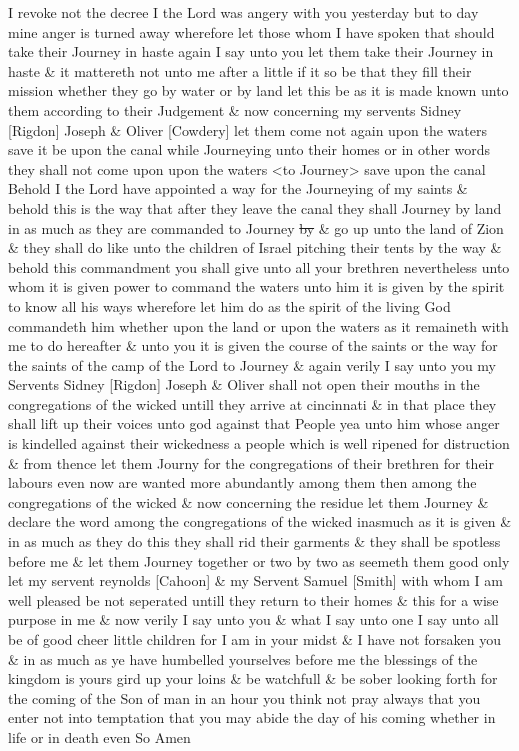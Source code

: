 {I revoke not the decree I the Lord was angery with you yesterday but to day mine anger is turned away wherefore let those whom I have spoken that should take their Journey in haste again I say unto you let them take their Journey in haste \& it mattereth not unto me after a little if it so be that they fill their mission whether they go by water or by land let this be as it is made known unto them according to their Judgement \& now concerning my servents Sidney [Rigdon] Joseph \& Oliver [Cowdery] let them come not again upon the waters save it be upon the canal while Journeying unto their homes or in other words they shall not come upon upon the waters <to Journey> save upon the canal Behold I the Lord have appointed a way for the Journeying of my saints \& behold this is the way that after they leave the canal they shall Journey by land in as much as they are commanded to Journey \sout{by} \& go up unto the land of Zion \& they shall do like unto the children of Israel pitching their tents by the way \& behold this commandment you shall give unto all your brethren nevertheless unto whom it is given power to command the waters unto him it is given by the spirit to know all his ways wherefore let him do as the spirit of the living God commandeth him whether upon the land or upon the waters as it remaineth with me to do hereafter \& unto you it is given the course of the saints or the way for the saints of the camp of the Lord to Journey \& again verily I say unto you my Servents Sidney [Rigdon] Joseph \& Oliver shall not open their mouths in the congregations of the wicked untill they arrive at cincinnati \& in that place they shall lift up their voices unto god against that People yea unto him whose anger is kindelled against their wickedness a people which is well ripened for distruction \& from thence let them Journy for the congregations of their brethren for their labours even now are wanted more abundantly among them then among the congregations of the wicked \& now concerning the residue let them Journey \& declare the word among the congregations of the wicked inasmuch as it is given \& in as much as they do this they shall rid their garments \& they shall be spotless before me \& let them Journey together or two by two as seemeth them good only let my servent reynolds [Cahoon] \& my Servent Samuel [Smith] with whom I am well pleased be not seperated untill they return to their homes \& this for a wise purpose in me \& now verily I say unto you \& what I say unto one I say unto all be of good cheer little children for I am in your midst \& I have not forsaken you \& in as much as ye have humbelled yourselves before me the blessings of the kingdom is yours gird up your loins \& be watchfull \& be sober looking forth for the coming of the Son of man in an hour you think not pray always that you enter not into temptation that you may abide the day of his coming whether in life or in death even So Amen
				
}
